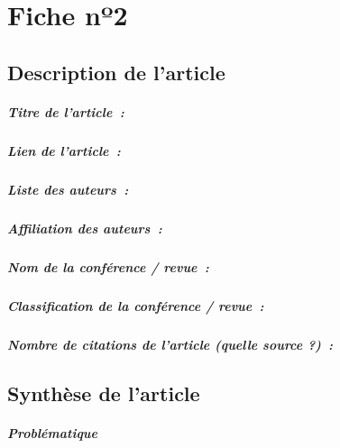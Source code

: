 
\chapter{Fiche nº2} %
\label{app:Fiche2} %

\section{Description de l'article}

\paragraph{Titre de l'article~:}
\paragraph{Lien de l'article~:}
\paragraph{Liste des auteurs~:}
\paragraph{Affiliation des auteurs~:}
\paragraph{Nom de la conférence / revue~:}
\paragraph{Classification de la conférence / revue~:}
\paragraph{Nombre de citations de l'article (quelle source ?)~:}



\section{Synthèse de l'article}

\paragraph{Problématique}
\lipsum[1]

